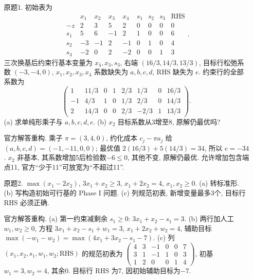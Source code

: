 \begin{exercise}\label{ass:15053-rec5-q1}
原题1. 初始表为
\[
\begin{array}{c|rrrrrrr|r}&x_1&x_2&x_3&x_4&s_1&s_2&s_3&\mathrm{RHS}\\\hline
-z&2&3&5&2&0&0&0&0\\s_1&5&6&-1&2&1&0&0&6\\s_2&-3&-1&2&-1&0&1&0&4\\s_3&-2&0&2&-2&0&0&1&3
\end{array}.
\]
三次换基后约束行基本变量为 $x_4,x_3,s_3$, 右端 $(16/3,14/3,13/3)$, 目标行松弛系数 $(-3,-4,0)$, $x_1,x_2,x_3,x_4$ 系数缺失为 $a,b,c,d$, RHS 缺失为 $e$. 约束行的全部系数为
\[\begin{pmatrix}1&11/3&0&1&2/3&1/3&0&16/3\\-1&4/3&1&0&1/3&2/3&0&14/3\\2&14/3&0&0&2/3&-2/3&1&13/3\end{pmatrix}.\]
(a) 求单纯形乘子与 $a,b,c,d,e$. (b) $x_2$ 目标系数从3增至8, 原解仍最优吗?
\end{exercise}
\begin{solution}
官方解答重构. 乘子 $\pi=(3,4,0)$, 约化成本 $c_j-\pi a_j$ 给 $(a,b,c,d)=(-1,-11,0,0)$; 最优值 $2(16/3)+5(14/3)=34$, 所以 $e=-34$. $x_2$ 非基本, 其系数增加5后检验数$-6\le0$, 其他不变, 原解仍最优. 允许增加包含端点11, 官方“少于11”可放宽为“不超过11”.
\end{solution}

\begin{exercise}\label{ass:15053-rec5-q2}
原题2. $\max(x_1-2x_2)$, $3x_1+x_2\ge3$, $x_1+2x_2=4$, $x_1,x_2\ge0$.
(a) 转标准形. (b) 写构造初始可行基的 Phase I 问题. (c) 列规范初表, 新增变量最多3个, 目标行 RHS 必须正确.
\end{exercise}
\begin{solution}
官方解答重构. (a) 第一约束减剩余 $s_1\ge0$: $3x_1+x_2-s_1=3$. (b) 两行加人工 $w_1,w_2\ge0$, 方程 $3x_1+x_2-s_1+w_1=3$, $x_1+2x_2+w_2=4$, 辅助目标 $\max(-w_1-w_2)=\max(4x_1+3x_2-s_1-7)$. (c) 列 $(x_1,x_2,s_1,w_1,w_2;\mathrm{RHS})$ 的规范初表为
$\left(\begin{smallmatrix}4&3&-1&0&0&7\\3&1&-1&1&0&3\\1&2&0&0&1&4\end{smallmatrix}\right)$, 初基 $w_1=3,w_2=4$, 其余0. 目标行 RHS 为7, 因初始辅助目标为$-7$.
\end{solution}

